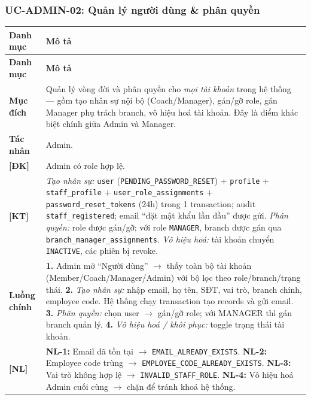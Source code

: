 \subsubsection{UC-ADMIN-02: Quản lý người dùng \& phân quyền}
\begingroup
\renewcommand{\arraystretch}{1.3}
\begin{longtable}{|>{\centering\arraybackslash}m{3cm}|>{\raggedright\arraybackslash}m{12cm}|}
\hline
\textbf{Danh mục} & \textbf{Mô tả} \\ \hline
\endfirsthead
\hline
\textbf{Danh mục} & \textbf{Mô tả} \\ \hline
\endhead
\hline
\endfoot
\textbf{Mục đích} & Quản lý vòng đời và phân quyền cho \emph{mọi tài khoản} trong hệ thống — gồm tạo nhân sự nội bộ (Coach/Manager), gán/gỡ role, gán Manager phụ trách branch, vô hiệu hoá tài khoản. Đây là điểm khác biệt chính giữa Admin và Manager. \\
\hline
\textbf{Tác nhân} & Admin. \\
\hline
\textbf{[ĐK]} & Admin có role hợp lệ. \\
\hline
\textbf{[KT]} & \emph{Tạo nhân sự:} \texttt{user} (\texttt{PENDING\_PASSWORD\_RESET}) + \texttt{profile} + \texttt{staff\_profile} + \texttt{user\_role\_assignments} + \texttt{password\_reset\_tokens} (24h) trong 1 transaction; audit \texttt{staff\_registered}; email ``đặt mật khẩu lần đầu'' được gửi. \emph{Phân quyền:} role được gán/gỡ; với role \texttt{MANAGER}, branch được gán qua \texttt{branch\_manager\_assignments}. \emph{Vô hiệu hoá:} tài khoản chuyển \texttt{INACTIVE}, các phiên bị revoke. \\
\hline
\textbf{Luồng chính} & \textbf{1.} Admin mở ``Người dùng'' $\rightarrow$ thấy toàn bộ tài khoản (Member/Coach/Manager/Admin) với bộ lọc theo role/branch/trạng thái. \textbf{2.} \emph{Tạo nhân sự:} nhập email, họ tên, SĐT, vai trò, branch chính, employee code. Hệ thống chạy transaction tạo records và gửi email. \textbf{3.} \emph{Phân quyền:} chọn user $\rightarrow$ gán/gỡ role; với MANAGER thì gán branch quản lý. \textbf{4.} \emph{Vô hiệu hoá / khôi phục:} toggle trạng thái tài khoản. \\
\hline
\textbf{[NL]} & \textbf{NL-1:} Email đã tồn tại $\rightarrow$ \texttt{EMAIL\_ALREADY\_EXISTS}. \textbf{NL-2:} Employee code trùng $\rightarrow$ \texttt{EMPLOYEE\_CODE\_ALREADY\_EXISTS}. \textbf{NL-3:} Vai trò không hợp lệ $\rightarrow$ \texttt{INVALID\_STAFF\_ROLE}. \textbf{NL-4:} Vô hiệu hoá Admin cuối cùng $\rightarrow$ chặn để tránh khoá hệ thống. \\
\hline
\end{longtable}
\endgroup
